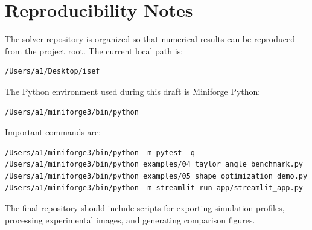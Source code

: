 \section{Reproducibility Notes}

The solver repository is organized so that numerical results can be reproduced from the project root. The current local path is:
\begin{verbatim}
/Users/a1/Desktop/isef
\end{verbatim}
The Python environment used during this draft is Miniforge Python:
\begin{verbatim}
/Users/a1/miniforge3/bin/python
\end{verbatim}
Important commands are:
\begin{verbatim}
/Users/a1/miniforge3/bin/python -m pytest -q
/Users/a1/miniforge3/bin/python examples/04_taylor_angle_benchmark.py
/Users/a1/miniforge3/bin/python examples/05_shape_optimization_demo.py
/Users/a1/miniforge3/bin/python -m streamlit run app/streamlit_app.py
\end{verbatim}
The final repository should include scripts for exporting simulation profiles, processing experimental images, and generating comparison figures.
